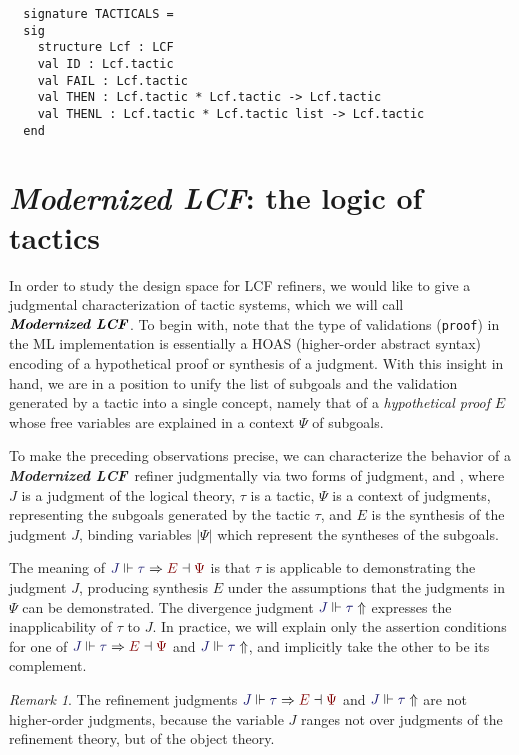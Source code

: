 \documentclass[11pt]{article}
\theoremstyle{definition}
\theoremstyle{remark}
\newtheorem{remark}[thm]{Remark}
\numberwithin{equation}{section}
\def\IModeColorName{MidnightBlue}
\def\OModeColorName{Maroon}
\newcommand\IMode[1]{{\color{\IModeColorName}{#1}}}
\newcommand\OMode[1]{{\color{\OModeColorName}{#1}}}
\newcommand\JJ{J}
\newcommand\Refine[4]{\IMode{#1}\Vdash\IMode{#2}\Rightarrow\OMode{#4}\dashv\OMode{#3}}
\newcommand\NoRefine[2]{\IMode{#1}\Vdash\IMode{#2}\Uparrow}
\newcommand\Dom[1]{\left\vert#1\right\vert}
\newcommand\ModLCF{\textbf{\emph{Modernized LCF}}}
\begin{document}
\begin{lstlisting}
  signature TACTICALS =
  sig
    structure Lcf : LCF
    val ID : Lcf.tactic
    val FAIL : Lcf.tactic
    val THEN : Lcf.tactic * Lcf.tactic -> Lcf.tactic
    val THENL : Lcf.tactic * Lcf.tactic list -> Lcf.tactic
  end
\end{lstlisting}

\section{\ModLCF: the logic of tactics}

In order to study the design space for LCF refiners, we would like to give a
judgmental characterization of tactic systems, which we will call $\ModLCF$.
To begin with, note that the type of validations (\verb!proof!) in the ML
implementation is essentially a HOAS (higher-order abstract syntax) encoding
of a hypothetical proof or synthesis of a judgment.  With this insight in hand,
we are in a position to unify the list of subgoals and the validation generated
by a tactic into a single concept, namely that of a \emph{hypothetical proof}
$E$ whose free variables are explained in a context $\Psi$ of subgoals.

To make the preceding observations precise, we can characterize the behavior of
a \ModLCF\ refiner judgmentally via two forms of judgment,
\framebox{$\Refine{\JJ}{\tau}{\Psi}{E}$} and \framebox{$\NoRefine{\JJ}{\tau}$},
where $\JJ$ is a judgment of the logical theory, $\tau$ is a tactic, $\Psi$ is
a context of judgments, representing the subgoals generated by the tactic
$\tau$, and $E$ is the synthesis of the judgment $\JJ$, binding variables
$\Dom{\Psi}$ which represent the syntheses of the subgoals.

The meaning of $\Refine{\JJ}{\tau}{\Psi}{E}$ is that $\tau$ is applicable to
demonstrating the judgment $\JJ$, producing synthesis $E$ under the assumptions
that the judgments in $\Psi$ can be demonstrated. The divergence judgment
$\NoRefine{\JJ}{\tau}$ expresses the inapplicability of $\tau$ to $\JJ$. In
practice, we will explain only the assertion conditions for one of
$\Refine{\JJ}{\tau}{\Psi}{E}$ and $\NoRefine{\JJ}{\tau}$, and implicitly take
the other to be its complement.

\begin{remark}
  The refinement judgments $\Refine{\JJ}{\tau}{\Psi}{E}$ and
  $\NoRefine{\JJ}{\tau}$ are not higher-order judgments, because the variable
  $\JJ$ ranges not over judgments of the refinement theory, but of the
  object theory.
\end{remark}
\end{document}
